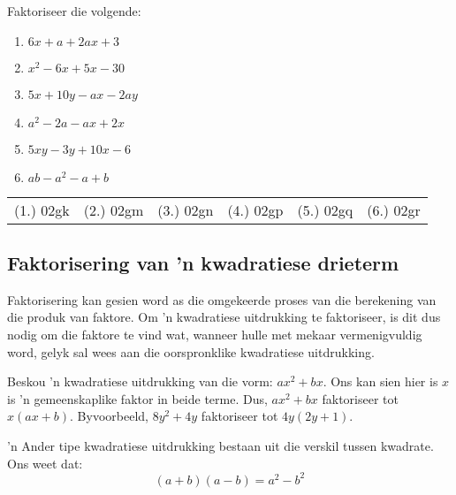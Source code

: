 \begin{exercises}{}{
\nopagebreak
Faktoriseer die volgende:
\begin{multicols}{2}
\begin{enumerate}[itemsep=5pt, label=\textbf{\arabic*}. ] 
\item $6x+a+2ax+3$
\item ${x}^{2}-6x+5x-30$
\item $5x+10y-ax-2ay$
\item ${a}^{2}-2a-ax+2x$
\item $5xy-3y+10x-6$
\item $ab - a^{2} - a + b$
\end{enumerate}
\end{multicols}

\par \practiceinfo
\par \begin{tabular}[h]{cccccc}
(1.)	02gk	&
(2.)	02gm	&
(3.)	02gn	&
(4.)	02gp	&
(5.)	02gq	&
(6.)	02gr	\\ %
\end{tabular}
}
\end{exercises}

\subsection* {Faktorisering van 'n kwadratiese drieterm}

    
Faktorisering kan gesien word as die omgekeerde proses van die berekening van die produk van faktore. Om ’n kwadratiese uitdrukking te faktoriseer, is dit dus nodig om die faktore te vind wat, wanneer hulle met mekaar vermenigvuldig word, gelyk sal wees aan die oorspronklike kwadratiese uitdrukking.\par 

Beskou ’n kwadratiese uitdrukking van die vorm: $a{x}^{2}+bx$. Ons kan sien hier is  $x$ is ’n gemeenskaplike faktor in beide terme. Dus, $a{x}^{2}+bx$  faktoriseer tot $x(ax+b)$. Byvoorbeeld, $8{y}^{2}+4y$ faktoriseer tot  $4y(2y+1)$.\par 
’n Ander tipe kwadratiese uitdrukking bestaan uit die verskil tussen kwadrate. Ons weet dat:
\begin{equation*}
(a+b)(a-b)={a}^{2}-{b}^{2}
\end{equation*}

